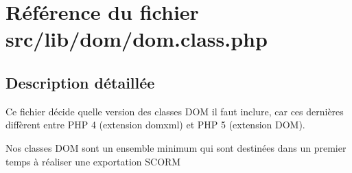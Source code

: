 \section{Référence du fichier src/lib/dom/dom.class.php}
\label{dom_8class_8php}


\subsection{Description détaillée}
Ce fichier décide quelle version des classes DOM il faut inclure, car ces dernières diffèrent entre PHP 4 (extension domxml) et PHP 5 (extension DOM). 

Nos classes DOM sont un ensemble minimum qui sont destinées dans un premier temps à réaliser une exportation SCORM 

